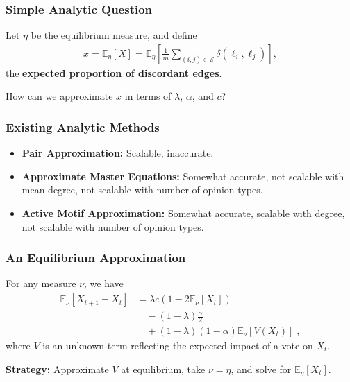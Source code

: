 \documentclass{beamer}
\begin{document}
		
		\begin{frame}\frametitle{Simple Analytic Question}
			Let $\eta$ be the equilibrium measure, and define 
			\begin{align*}
				x = \mathbb{E}_\eta[X] = \mathbb{E}_\eta\left[\frac{1}{m}\sum_{(i,j) \in \mathcal{E}} \delta (\ell_i, \ell_j)\right],
			\end{align*}
			the \textbf{expected proportion of discordant edges}. 

			How can we approximate $x$ in terms of $\lambda$, $\alpha$, and $c$?
		\end{frame}
	
		
		\begin{frame}\frametitle{Existing Analytic Methods}

			\begin{itemize}
				\item \textbf{Pair Approximation:} Scalable, inaccurate. \cite{Demirel2012,Durrett2012}
				\item \textbf{Approximate Master Equations:} Somewhat accurate, not scalable with mean degree, not scalable with number of opinion types. \cite{Durrett2012}
				\item \textbf{Active Motif Approximation:} Somewhat accurate, scalable with degree, not scalable with number of opinion types. \cite{Demirel2012}
			\end{itemize}

		\end{frame}
	
		
		\begin{frame}\frametitle{An Equilibrium Approximation}
			For any measure $\nu$, we have 
			\begin{align*}
				\mathbb{E}_\nu[X_{t+1} - X_{t}] &= \lambda c(1-2\mathbb{E}_\nu[X_t])  \tag{mutate} \\ 
											&\quad - (1-\lambda)\frac{\alpha}{2} \tag{rewire} \\ 
											&\quad + (1-\lambda)(1-\alpha)\mathbb{E}_\nu[V(X_t)]\;, \tag{vote}
			\end{align*}
			where $V$ is an unknown term reflecting the expected impact of a vote on $X_t$. 

			\textbf{Strategy:} Approximate $V$ at equilibrium, take $\nu = \eta$, and solve for $\mathbb{E}_\eta[X_t]$.

		\end{frame}
	
\end{document}
